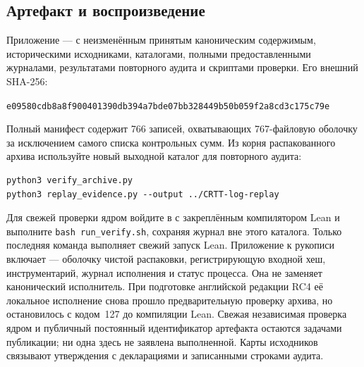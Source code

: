 \subsection{Артефакт и воспроизведение}\label{sec:artifact}
Приложение ---  \cite{crttartifact} с неизменённым принятым каноническим содержимым, историческими исходниками, каталогами, полными предоставленными журналами, результатами повторного аудита и скриптами проверки. Его внешний SHA-256:
\begin{center}\small\texttt{e09580cdb8a8f900401390db394a7bde07bb328449b50b059f2a8cd3c175c79e}\end{center}
Полный манифест содержит 766 записей, охватывающих 767-файловую оболочку за исключением самого списка контрольных сумм. Из корня распакованного архива используйте новый выходной каталог для повторного аудита:
\begin{verbatim}
python3 verify_archive.py
python3 replay_evidence.py --output ../CRTT-log-replay
\end{verbatim}
Для свежей проверки ядром войдите в  с закреплённым компилятором Lean и выполните \verb|bash run_verify.sh|, сохраняя журнал вне этого каталога. Только последняя команда выполняет свежий запуск Lean. Приложение к рукописи включает  --- оболочку чистой распаковки, регистрирующую входной хеш, инструментарий, журнал исполнения и статус процесса. Она не заменяет канонический исполнитель. При подготовке английской редакции RC4 её локальное исполнение снова прошло предварительную проверку архива, но остановилось с кодом~127 до компиляции Lean. Свежая независимая проверка ядром и публичный постоянный идентификатор артефакта остаются задачами публикации; ни одна здесь не заявлена выполненной. Карты исходников связывают утверждения с декларациями и записанными строками аудита.
